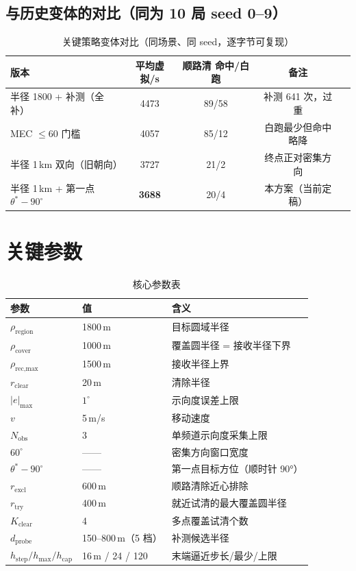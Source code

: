 \documentclass[a4paper,11pt]{ctexart}
\begin{document}
\subsection{与历史变体的对比（同为 10 局 seed 0--9）}
\begin{table}[H]
  \centering
  \caption{关键策略变体对比（同场景、同 seed，逐字节可复现）}
  \label{tab:variants}
  \begin{tabular}{lcccc}
    \toprule
    版本 & 平均虚拟/s & 顺路清 命中/白跑 & 备注 \\
    \midrule
    半径 1800 + 补测（全补） & 4473 & 89/58 & 补测 641 次，过重 \\
    MEC $\le 60$ 门槛 & 4057 & 85/12 & 白跑最少但命中略降 \\
    半径 1\,km 双向（旧朝向） & 3727 & 21/2 & 终点正对密集方向 \\
    半径 1\,km + 第一点 $\theta^*-90^\circ$ & \textbf{3688} & 20/4 & 本方案（当前定稿） \\
    \bottomrule
  \end{tabular}
\end{table}

\section{关键参数}
\begin{table}[H]
  \centering
  \caption{核心参数表}
  \label{tab:params}
  \begin{tabular}{lll}
    \toprule
    参数 & 值 & 含义 \\
    \midrule
    $\rho_{\text{region}}$ & 1800\,m & 目标圆域半径 \\
    $\rho_{\text{cover}}$ & 1000\,m & 覆盖圆半径 = 接收半径下界 \\
    $\rho_{\text{rec,max}}$ & 1500\,m & 接收半径上界 \\
    $r_{\text{clear}}$ & 20\,m & 清除半径 \\
    $|e|_{\max}$ & $1^\circ$ & 示向度误差上限 \\
    $v$ & 5\,m/s & 移动速度 \\
    $N_{\text{obs}}$ & $3$ & 单频道示向度采集上限 \\
    $60^\circ$ & —— & 密集方向窗口宽度 \\
    $\theta^* - 90^\circ$ & —— & 第一点目标方位（顺时针 90°） \\
    $r_{\text{excl}}$ & 600\,m & 顺路清除近心排除 \\
    $r_{\text{try}}$ & 400\,m & 就近试清的最大覆盖圆半径 \\
    $K_{\text{clear}}$ & 4 & 多点覆盖试清个数 \\
    $d_{\text{probe}}$ & 150--800\,m（5 档） & 补测候选半径 \\
    $h_{\text{step}}/h_{\max}/h_{\text{cap}}$ & 16\,m / 24 / 120 & 末端逼近步长/最少/上限 \\
    \bottomrule
  \end{tabular}
\end{table}
\end{document}
